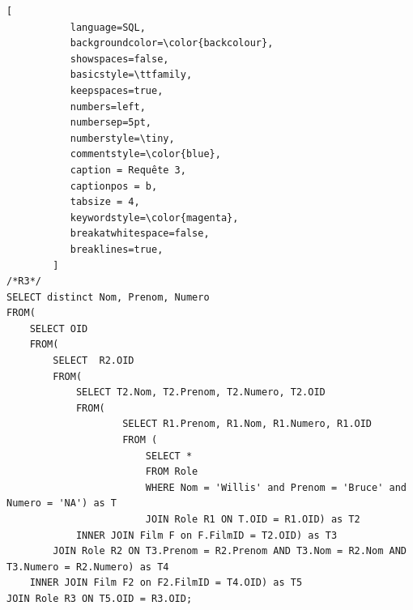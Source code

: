 \documentclass[10pt,a4paper]{article}
\begin{document}
\begin{lstlisting}[
           language=SQL,
           backgroundcolor=\color{backcolour},
           showspaces=false,
           basicstyle=\ttfamily,
           keepspaces=true,                 
           numbers=left,                    
           numbersep=5pt,
           numberstyle=\tiny,
           commentstyle=\color{blue},
           caption = Requête 3,
           captionpos = b,
           tabsize = 4,
           keywordstyle=\color{magenta},
           breakatwhitespace=false,         
           breaklines=true,
        ]
/*R3*/
SELECT distinct Nom, Prenom, Numero
FROM(
	SELECT OID
	FROM(
		SELECT 	R2.OID
		FROM(
			SELECT T2.Nom, T2.Prenom, T2.Numero, T2.OID
			FROM(
					SELECT R1.Prenom, R1.Nom, R1.Numero, R1.OID
					FROM (
						SELECT *
						FROM Role
						WHERE Nom = 'Willis' and Prenom = 'Bruce' and Numero = 'NA') as T
						JOIN Role R1 ON T.OID = R1.OID) as T2
			INNER JOIN Film F on F.FilmID = T2.OID) as T3
		JOIN Role R2 ON T3.Prenom = R2.Prenom AND T3.Nom = R2.Nom AND T3.Numero = R2.Numero) as T4
	INNER JOIN Film F2 on F2.FilmID = T4.OID) as T5
JOIN Role R3 ON T5.OID = R3.OID;
\end{lstlisting}
\end{document}

